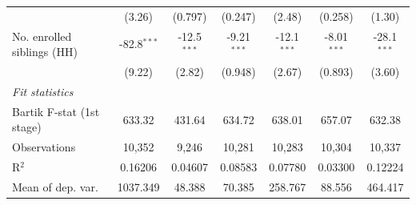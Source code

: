 \begin{tabular}{lcccccc}
                                                                         & (3.26)                                   & (0.797)                       & (0.247)                     & (2.48)                          & (0.258)                       & (1.30)\\   
   No. enrolled siblings (HH)                                            & -82.8$^{***}$                            & -12.5$^{***}$                 & -9.21$^{***}$               & -12.1$^{***}$                   & -8.01$^{***}$                 & -28.1$^{***}$\\   
                                                                         & (9.22)                                   & (2.82)                        & (0.948)                     & (2.67)                          & (0.893)                       & (3.60)\\   
   \midrule
   \emph{Fit statistics}\\
   Bartik F-stat (1st stage)                                     & 633.32                                   & 431.64                        & 634.72                      & 638.01                          & 657.07                        & 632.38\\  
   Observations                                                          & 10,352                                   & 9,246                         & 10,281                      & 10,283                          & 10,304                        & 10,337\\  
   R$^2$                                                                 & 0.16206                                  & 0.04607                       & 0.08583                     & 0.07780                         & 0.03300                       & 0.12224\\  
   Mean of dep. var.                                                     & 1037.349                                 & 48.388                        & 70.385                      & 258.767                         & 88.556                        & 464.417\\  
\bottomrule
\end{tabular}
